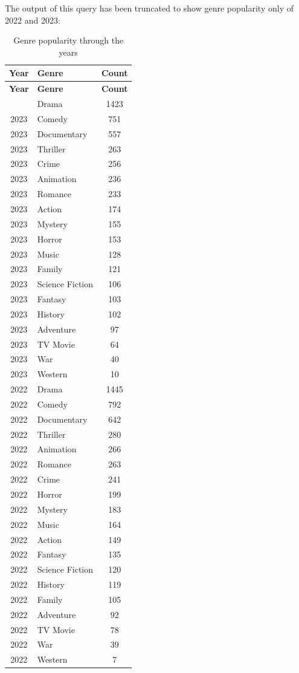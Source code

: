 \documentclass{Configuration_Files/PoliMi3i_thesis}
\begin{document}
\inputminted[frame=single,framesep=10pt,breaklines]{cypher}{letterboxd/queries/query5.cypher}

The output of this query has been truncated to show genre popularity only of 2022 and 2023:

\begin{longtable}[!h]{|c|l|c|}
\caption{Genre popularity through the years} \\
\hline
\textbf{Year} & \textbf{Genre} & \textbf{Count} \\
\hline
\endfirsthead
\hline
\textbf{Year} & \textbf{Genre} & \textbf{Count} \\
\hline
\endhead
\hline
\endfoot
\hline
2023 & Drama & 1423 \\
2023 & Comedy & 751 \\
2023 & Documentary & 557 \\
2023 & Thriller & 263 \\
2023 & Crime & 256 \\
2023 & Animation & 236 \\
2023 & Romance & 233 \\
2023 & Action & 174 \\
2023 & Mystery & 155 \\
2023 & Horror & 153 \\
2023 & Music & 128 \\
2023 & Family & 121 \\
2023 & Science Fiction & 106 \\
2023 & Fantasy & 103 \\
2023 & History & 102 \\
2023 & Adventure & 97 \\
2023 & TV Movie & 64 \\
2023 & War & 40 \\
2023 & Western & 10 \\
2022 & Drama & 1445 \\
2022 & Comedy & 792 \\
2022 & Documentary & 642 \\
2022 & Thriller & 280 \\
2022 & Animation & 266 \\
2022 & Romance & 263 \\
2022 & Crime & 241 \\
2022 & Horror & 199 \\
2022 & Mystery & 183 \\
2022 & Music & 164 \\
2022 & Action & 149 \\
2022 & Fantasy & 135 \\
2022 & Science Fiction & 120 \\
2022 & History & 119 \\
2022 & Family & 105 \\
2022 & Adventure & 92 \\
2022 & TV Movie & 78 \\
2022 & War & 39 \\
2022 & Western & 7 \\
\end{longtable}
\end{document}
